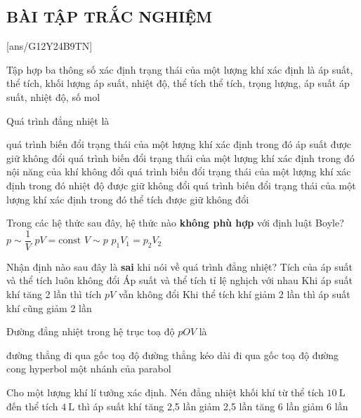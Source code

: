 \subsection{BÀI TẬP TRẮC NGHIỆM}
[ans/G12Y24B9TN]
\begin{ex}
	Tập hợp ba thông số xác định trạng thái của một lượng khí xác định là
	\choice
	{áp suất, thể tích, khối lượng}
	{\True áp suất, nhiệt độ, thể tích}
	{thể tích, trọng lượng, áp suất}
	{áp suất, nhiệt độ, số mol}
	\loigiai{}
\end{ex}
\begin{ex}
	Quá trình đẳng nhiệt là
	
	\choice
	{quá trình biến đổi trạng thái của một lượng khí xác định trong đó áp suất được giữ không đổi}
	{quá trình biến đổi trạng thái của một lượng khí xác định trong đó nội năng của khí không đổi}
	{\True quá trình biến đổi trạng thái của một lượng khí xác định trong đó nhiệt độ được giữ không đổi}
	{quá trình biến đổi trạng thái của một lượng khí xác định trong đó thể tích được giữ không đổi}
	\loigiai{}
\end{ex}
\begin{ex}
	Trong các hệ thức sau đây, hệ thức nào \textbf{không phù hợp} với định luật Boyle?
	\choice
	{$p\sim\dfrac{1}{V}$}
	{$pV=\text{const}$}
	{\True $V\sim p$}
	{$p_1V_1=p_2V_2$}
	\loigiai{}
\end{ex}
\begin{ex}
Nhận định nào sau đây là \textbf{sai} khi nói về quá trình đẳng nhiệt?	
	\choice
	{Tích của áp suất và thể tích luôn không đổi}
	{Áp suất và thể tích tỉ lệ nghịch với nhau}
	{Khi áp suất khí tăng 2 lần thì tích $pV$ vẫn không đổi}
	{\True Khi thể tích khí giảm 2 lần thì áp suất khí cũng giảm 2 lần}
	\loigiai{}
\end{ex}
\begin{ex}
Đường đẳng nhiệt trong hệ trục toạ độ $pOV$ là
	
	\choice
	{đường thẳng đi qua gốc toạ độ}
	{đường thẳng kéo dài đi qua gốc toạ độ}
	{\True đường cong hyperbol}
	{một nhánh của parabol}
	\loigiai{}
\end{ex}
\begin{ex}
	Cho một lượng khí lí tưởng xác định. Nén đẳng nhiệt khối khí từ thể tích $\SI{10}{\liter}$ đến thể tích $\SI{4}{\liter}$ thì áp suất khí
	\choice
	{\True tăng 2,5 lần}
	{giảm 2,5 lần}
	{tăng 6 lần}
	{giảm 6 lần}
\end{ex}

